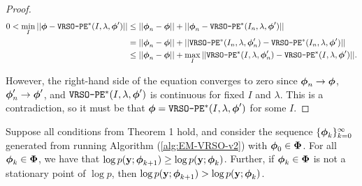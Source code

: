 \begin{proof}
    \begin{align}
        0 < \min_{I}||\boldsymbol{\phi} - \texttt{VRSO-PE}^*(I,\lambda,\boldsymbol{\phi}')|| &\leq ||\boldsymbol{\phi}_{n} - \boldsymbol{\phi}|| + ||\boldsymbol{\phi}_{n} - \texttt{VRSO-PE}^*(I_n,\lambda,\boldsymbol{\phi}')|| \\
        &= ||\boldsymbol{\phi}_{n} - \boldsymbol{\phi}|| + ||\texttt{VRSO-PE}^*(I_n,\lambda,\boldsymbol{\phi}'_{n}) - \texttt{VRSO-PE}^*(I_n,\lambda,\boldsymbol{\phi}')|| \\
        &\leq ||\boldsymbol{\phi}_{n} - \boldsymbol{\phi}|| + \max_{I} ||\texttt{VRSO-PE}^*(I,\lambda,\boldsymbol{\phi}'_{n}) - \texttt{VRSO-PE}^*(I,\lambda,\boldsymbol{\phi}')||.
    \end{align}
    
    However, the right-hand side of the equation converges to zero since $\boldsymbol{\phi}_n \to \boldsymbol{\phi}$, $\boldsymbol{\phi}'_n \to \boldsymbol{\phi}'$, and $\texttt{VRSO-PE}^*(I,\lambda,\boldsymbol{\phi}')$ is continuous for fixed $I$ and $\lambda$. This is a contradiction, so it must be that $\boldsymbol{\phi} = \texttt{VRSO-PE}^*(I,\lambda,\boldsymbol{\phi}')$ for some $I$.
\end{proof}

\begin{lemma}
    Suppose all conditions from Theorem 1 hold, and consider the sequence $\{\boldsymbol{\phi}_k\}_{k=0}^{\infty}$ generated from running Algorithm (\ref{alg:EM-VRSO-v2}) with $\boldsymbol{\phi}_0 \in \boldsymbol{\Phi}$. For all $\boldsymbol{\phi}_k \in \boldsymbol{\Phi}$, we have that $\log p(\mathbf{y};\boldsymbol{\phi}_{k+1}) \geq \log p(\mathbf{y};\boldsymbol{\phi}_k)$. Further, if $\boldsymbol{\phi}_k \in \boldsymbol{\Phi}$ is not a stationary point of $\log p$, then $\log p(\mathbf{y};\boldsymbol{\phi}_{k+1}) > \log p(\mathbf{y};\boldsymbol{\phi}_k)$.
\end{lemma}

